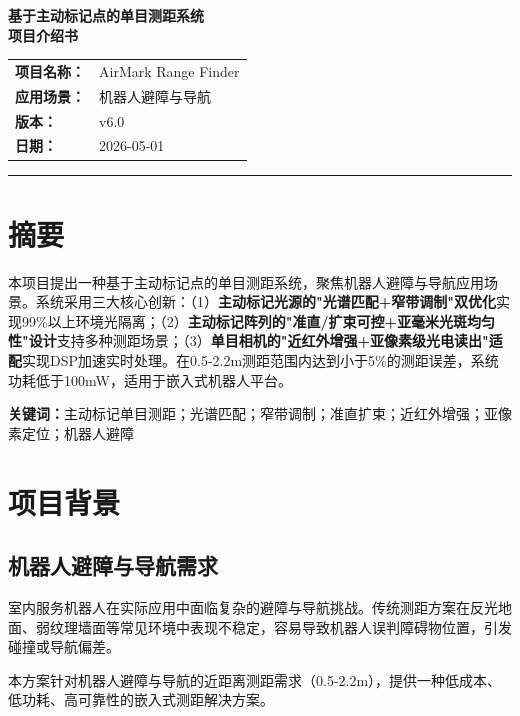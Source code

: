 \documentclass[12pt, a4paper]{ctexart}
\begin{document}
\begin{center}
\fontsize{16pt}{24pt}\selectfont\textbf{基于主动标记点的单目测距系统}\\[0.5em]
\fontsize{14pt}{21pt}\selectfont\textbf{项目介绍书}
\end{center}

\bigskip

\begin{center}
\begin{tabular}{ll}
\textbf{项目名称：} & AirMark Range Finder \\
\textbf{应用场景：} & 机器人避障与导航 \\
\textbf{版本：} & v6.0 \\
\textbf{日期：} & 2026-05-01 \\
\end{tabular}
\end{center}

\bigskip
\hrule
\bigskip

\section*{摘要}

本项目提出一种基于主动标记点的单目测距系统，聚焦机器人避障与导航应用场景。系统采用三大核心创新：（1）\textbf{主动标记光源的"光谱匹配+窄带调制"双优化}实现99\%以上环境光隔离；（2）\textbf{主动标记阵列的"准直/扩束可控+亚毫米光斑均匀性"设计}支持多种测距场景；（3）\textbf{单目相机的"近红外增强+亚像素级光电读出"适配}实现DSP加速实时处理。在0.5-2.2m测距范围内达到小于5\%的测距误差，系统功耗低于100mW，适用于嵌入式机器人平台。

\textbf{关键词：}主动标记单目测距；光谱匹配；窄带调制；准直扩束；近红外增强；亚像素定位；机器人避障

\section{项目背景}

\subsection{机器人避障与导航需求}

室内服务机器人在实际应用中面临复杂的避障与导航挑战。传统测距方案在反光地面、弱纹理墙面等常见环境中表现不稳定，容易导致机器人误判障碍物位置，引发碰撞或导航偏差。

本方案针对机器人避障与导航的近距离测距需求（0.5-2.2m），提供一种低成本、低功耗、高可靠性的嵌入式测距解决方案。
\end{document}
